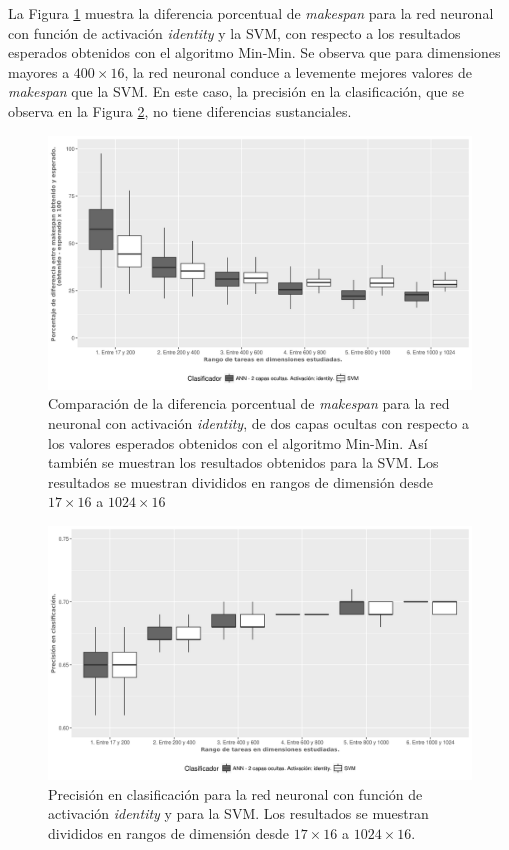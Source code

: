 La Figura \ref{fig:identity_makespan} muestra la diferencia porcentual de \textit{makespan} para la red neuronal con función de activación \textit{identity} y la SVM, con respecto a los resultados esperados obtenidos con el algoritmo Min-Min.
Se observa que para dimensiones mayores a $ 400 \times 16$, la red neuronal conduce a levemente mejores valores de \textit{makespan} que la SVM.
En este caso, la precisión en la clasificación, que se observa en la Figura \ref{fig:identity_accuracy}, no tiene diferencias sustanciales. 

\begin{figure}[H]
  \centering
  \includegraphics[width=\columnwidth]{imagenes/identity/2_medianas_diferenciasann_2_capas_ocultas_identity.png}
  \caption{Comparación de la diferencia porcentual de \textit{makespan} para la red neuronal con activación \textit{identity}, de dos capas ocultas con respecto a los valores esperados obtenidos con el algoritmo Min-Min.
Así también se muestran los resultados obtenidos para la SVM.
Los resultados se muestran divididos en rangos de dimensión desde $ 17 \times 16$ a $ 1024 \times 16$}
  \label{fig:identity_makespan}
\end{figure}

\begin{figure}[H]
  \centering
  \includegraphics[width=\columnwidth]{imagenes/identity/3_accuracy_ann_2_capas_ocultas_identity.png}
  \caption{Precisión en clasificación para la red neuronal con función de activación \textit{identity} y para la SVM.
Los resultados se muestran divididos en rangos de dimensión desde $ 17 \times 16$ a $ 1024 \times 16$.}
  \label{fig:identity_accuracy}
\end{figure}

